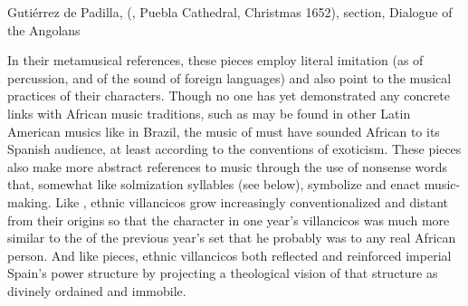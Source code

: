 {Gutiérrez de Padilla,  
(, Puebla Cathedral, Christmas 1652), 
section, Dialogue of the Angolans}

In their metamusical references, these pieces employ literal
imitation (as of percussion, and of the  sound of foreign
languages) and also point to the musical practices of their characters.
Though no one has yet demonstrated any concrete links with African music
traditions, such as may be found in other Latin American musics like
 in Brazil, the music of  must have
sounded African to its Spanish audience, at least according to the conventions
of exoticism.%
    \Autocite{Kubik:AngolanTraits} %
These pieces also make more abstract references to music through the use of
nonsense words that, somewhat like solmization syllables (see below), symbolize
and enact music-making.
Like , ethnic villancicos grow increasingly conventionalized and
distant from their origins so that the  character in one year's
villancicos was much more similar to the  of the previous year's
set that he probably was to any real African person.
And like  pieces, ethnic villancicos both reflected and reinforced
imperial Spain's power structure by projecting a theological vision of that
structure as divinely ordained and immobile.

